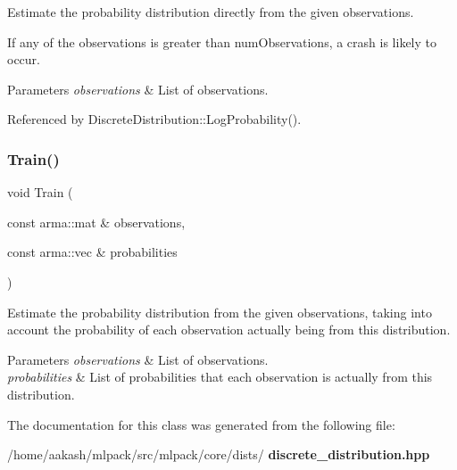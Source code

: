Estimate the probability distribution directly from the given observations. 

If any of the observations is greater than num\+Observations, a crash is likely to occur.


\begin{DoxyParams}{Parameters}
{\em observations} & List of observations. \\
\hline
\end{DoxyParams}


Referenced by Discrete\+Distribution\+::\+Log\+Probability().

\mbox{\label{classmlpack_1_1distribution_1_1DiscreteDistribution_ad71152f8853ac60c92a165ed72384125}} 
\subsubsection{Train()\hspace{0.1cm}{\footnotesize\ttfamily [2/2]}}
{\footnotesize\ttfamily void Train (\begin{DoxyParamCaption}\item[{const arma\+::mat \&}]{observations,  }\item[{const arma\+::vec \&}]{probabilities }\end{DoxyParamCaption})}



Estimate the probability distribution from the given observations, taking into account the probability of each observation actually being from this distribution. 


\begin{DoxyParams}{Parameters}
{\em observations} & List of observations. \\
\hline
{\em probabilities} & List of probabilities that each observation is actually from this distribution. \\
\hline
\end{DoxyParams}


The documentation for this class was generated from the following file\+:\begin{DoxyCompactItemize}
\item 
/home/aakash/mlpack/src/mlpack/core/dists/\textbf{ discrete\+\_\+distribution.\+hpp}\end{DoxyCompactItemize}
